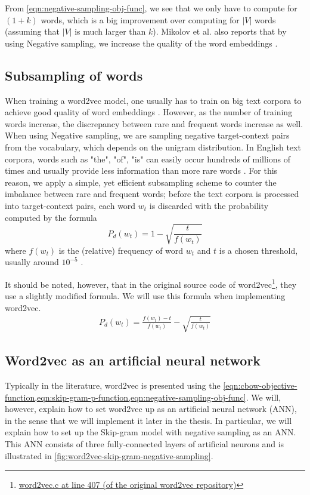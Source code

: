 From \cref{eqn:negative-sampling-obj-func}, we see that we only have to compute for $(1 + k)$ words, which is a big improvement over computing for $|V|$ words (assuming that $|V|$ is much larger than $k$). Mikolov et al. also reports that by using Negative sampling, we increase the quality of the word embeddings \cite{mikolov2013b}.

\subsection{Subsampling of words}
When training a word2vec model, one usually has to train on big text corpora to achieve good quality of word embeddings \cite{mikolov2013a}. However, as the number of training words increase, the discrepancy between rare and frequent words increase as well. When using Negative sampling, we are sampling negative target-context pairs from the vocabulary, which depends on the unigram distribution. In English text corpora, words such as "the", "of", "is" can easily occur hundreds of millions of times and usually provide less information than more rare words \cite{mikolov2013b}. For this reason, we apply a simple, yet efficient subsampling scheme to counter the imbalance between rare and frequent words; before the text corpora is processed into target-context pairs, each word $w_t$ is discarded with the probability computed by the formula \cite{mikolov2013b, levy-etal-2015-improving}
\begin{equation}
    P_d(w_t) = 1 - \sqrt{\frac{t}{f(w_t)}}
\end{equation}
where $f(w_t)$ is the (relative) frequency of word $w_t$ and $t$ is a chosen threshold, usually around $10^{-5}$ \cite{mikolov2013b}.


It should be noted, however, that in the original source code of word2vec\footnote{\href{https://github.com/tmikolov/word2vec/blob/e092540633572b883e25b367938b0cca2cf3c0e7/word2vec.c\#L407}{word2vec.c at line 407 (of the original word2vec repository)}}, they use a slightly modified formula. We will use this formula when implementing word2vec.
\begin{align}
    P_d(w_t) = \frac{f(w_t) - t}{f(w_t)} - \sqrt{\frac{t}{f(w_t)}}
\end{align}

\subsection{Word2vec as an artificial neural network}
Typically in the literature, word2vec is presented using the \cref{eqn:cbow-objective-function,eqn:skip-gram-p-function,eqn:negative-sampling-obj-func}. We will, however, explain how to set word2vec up as an artificial neural network (ANN), in the sense that we will implement it later in the thesis. In particular, we will explain how to set up the Skip-gram model with negative sampling as an ANN. This ANN consists of three fully-connected layers of artificial neurons \cite{rong2016word2vec} and is illustrated in \cref{fig:word2vec-skip-gram-negative-sampling}.

